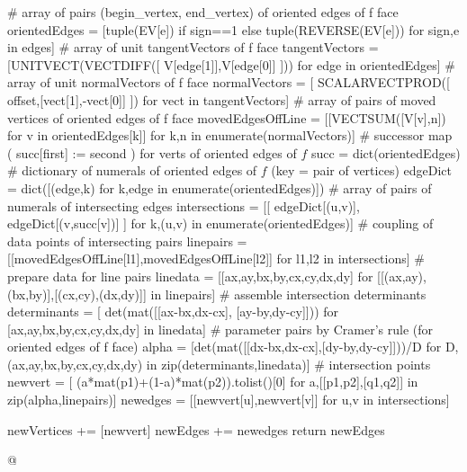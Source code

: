 \documentclass[11pt,oneside]{article}    %
\begin{document}
{        # array of pairs (begin_vertex, end_vertex) of oriented edges of f face
        orientedEdges = [tuple(EV[e]) if sign==1 else tuple(REVERSE(EV[e])) 
            for sign,e in edges]
        # array of unit tangentVectors of  f face
        tangentVectors = [UNITVECT(VECTDIFF([ V[edge[1]],V[edge[0]] ])) 
            for edge in orientedEdges]
        # array of unit normalVectors of   f face
        normalVectors = [ SCALARVECTPROD([ offset,[vect[1],-vect[0]] ]) 
            for vect in tangentVectors]
        # array of pairs of moved vertices  of oriented edges of f face
        movedEdgesOffLine = [[VECTSUM([V[v],n]) for v in orientedEdges[k]] 
            for k,n in enumerate(normalVectors)]
        # successor map ( succ[first] := second ) for verts of oriented edges of $f$ 
        succ = dict(orientedEdges)
        # dictionary of numerals of oriented edges of $f$ (key = pair of vertices)
        edgeDict = dict([(edge,k) for k,edge in enumerate(orientedEdges)])
        # array of pairs of numerals of intersecting edges
        intersections = [[ edgeDict[(u,v)], edgeDict[(v,succ[v])] ] 
            for k,(u,v) in enumerate(orientedEdges)]
        # coupling of data points of intersecting pairs
        linepairs = [[movedEdgesOffLine[l1],movedEdgesOffLine[l2]] 
            for l1,l2 in intersections]
        # prepare data for line pairs
        linedata = [[ax,ay,bx,by,cx,cy,dx,dy] 
            for [[(ax,ay),(bx,by)],[(cx,cy),(dx,dy)]] in linepairs]
        # assemble intersection determinants
        determinants = [ det(mat([[ax-bx,dx-cx], [ay-by,dy-cy]])) 
            for [ax,ay,bx,by,cx,cy,dx,dy] in linedata]
        # parameter pairs by Cramer's rule (for oriented edges of f face)
        alpha = [det(mat([[dx-bx,dx-cx],[dy-by,dy-cy]]))/D 
            for D,(ax,ay,bx,by,cx,cy,dx,dy) in zip(determinants,linedata)]
        # intersection points
        newvert = [ (a*mat(p1)+(1-a)*mat(p2)).tolist()[0] 
            for a,[[p1,p2],[q1,q2]] in zip(alpha,linepairs)]
        newedges = [[newvert[u],newvert[v]] for u,v in intersections]

        newVertices += [newvert]
        newEdges += newedges  
    return newEdges

@}
\end{document}
